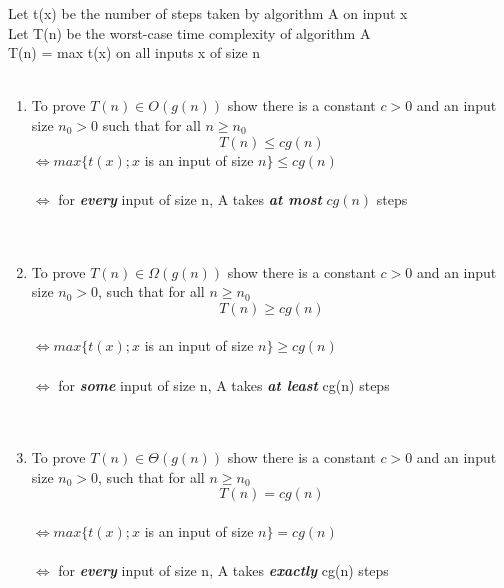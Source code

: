 \documentclass{article}
\begin{document}
		Let t(x) be the number of steps taken by algorithm A on input x\\
		Let T(n) be the worst-case time complexity of algorithm A\\
		T(n) = max t(x) on all inputs x of size n\\
		\\
		\begin{enumerate}
			\item To prove $T(n)\in O(g(n))$ show there is a constant $c>0$ and an input size $n_0 >0$ such that for all $n \ge n_0$\\
			$$T(n) \le cg(n)$$
			$\iff max\{t(x); x$ is an input of size $n \} \le cg(n)$\\
			\\
			$\iff$ for \textbf{\emph{every}} input of size n, A takes \textbf{\emph{at most}} $cg(n)$ steps\\
			\\\\
			\item To prove $T(n)\in\Omega (g(n))$ show there is a constant $c>0$ and an input size $n_0 >0$, such that for all $n\ge n_0$\\
			$$T(n)\ge cg(n)$$\\
			$\iff max\{t(x); x$ is an input of size $n\} \ge cg(n)$\\\\
			$\iff$ for \textbf{\emph{some}} input of size n, A takes \textbf{\emph{at least}} cg(n) steps\\\\
			\\
			\item To prove $T(n)\in\Theta (g(n))$ show there is a constant $c>0$ and an input size $n_0 >0$, such that for all $n \ge n_0$\\
			$$T(n) = cg(n)$$\\
			$\iff max\{t(x); x$ is an input of size $n\} = cg(n)$\\\\
			$\iff$ for \textbf{\emph{every}} input of size n, A takes \textbf{\emph{exactly}} cg(n) steps\\\\\\\\
			
			
		\end{enumerate}
	
\end{document}
